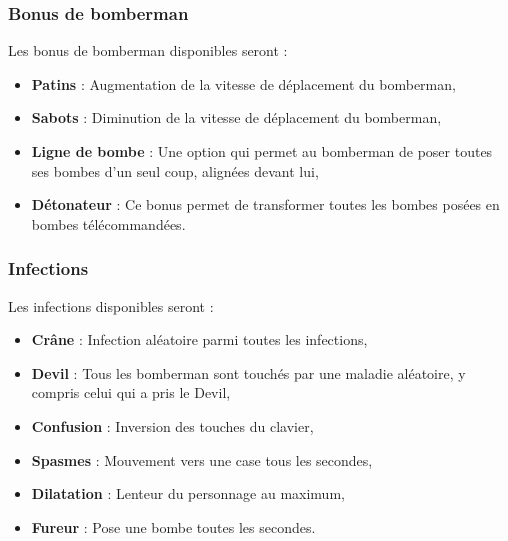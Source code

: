 \subsubsection{Bonus de bomberman}

Les bonus de bomberman disponibles seront :
\begin{itemize}
\item \textbf{Patins} : Augmentation de la vitesse de déplacement du bomberman,
\item \textbf{Sabots} : Diminution de la vitesse de déplacement du bomberman,
\item \textbf{Ligne de bombe} : Une option qui permet au bomberman de poser toutes ses bombes d'un seul coup, alignées devant lui,
\item \textbf{Détonateur} : Ce bonus permet de transformer toutes les bombes posées en bombes télécommandées.
\end{itemize}

\subsubsection{Infections}

Les infections disponibles seront :
\begin{itemize}
\item \textbf{Crâne} : Infection aléatoire parmi toutes les infections,
\item \textbf{Devil} : Tous les bomberman sont touchés par une maladie aléatoire, y compris celui qui a pris le Devil,
\item \textbf{Confusion} : Inversion des touches du clavier,
\item \textbf{Spasmes} : Mouvement vers une case tous les \nbSecondes secondes,
\item \textbf{Dilatation} : Lenteur du personnage au maximum,
\item \textbf{Fureur} : Pose une bombe toutes les \nbSecondes secondes.
\end{itemize}